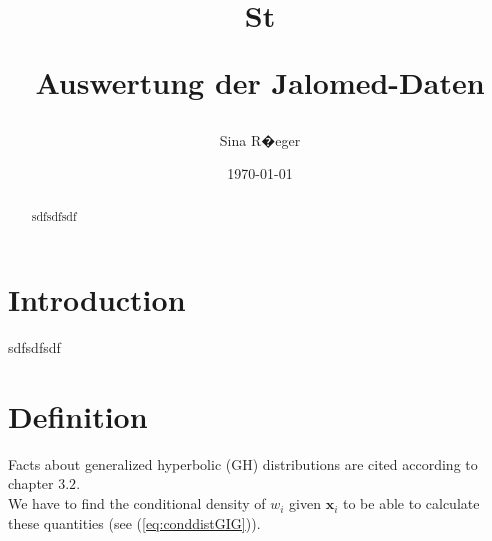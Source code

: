 \documentclass[paper=a4,fontsize=11pt,parskip=half,titlepage,headsepline,tocleft,english]{scrreprt}
\newcommand{\x}{\mathbf{x}}
\newcommand{\EXP}[1]{\hbox{E}(#1)}
\newcommand{\etaIK}{\eta_i^{[k]}}
\newcommand{\deltaIK}{\delta_i^{[k]}}
\newcommand{\xiIK}{\xi_i^{[k]}}
\newcommand{\ThetaK}{\Theta^{[k]}}
\renewcommand{\labelenumi}{(\roman{enumi})}
\numberwithin{equation}{section}
\numberwithin{table}{section}
\numberwithin{figure}{section}
\begin{document}
\title{St





















 Auswertung der Jalomed-Daten}
\author{Sina R�eger}
\date{\today}

\maketitle

\begin{abstract}
sdfsdfsdf
\end{abstract}
\thispagestyle{empty}
\clearpage
{}
\tableofcontents{}
\clearpage
\section{Introduction}
sdfsdfsdf
\section{Definition}
Facts about generalized hyperbolic (GH) distributions are cited according to
\cite{mcneil} chapter $3.2$.\\[1ex]


We have to find the conditional density of $w_i$ given $\x_i$ to
be able to calculate these quantities (see (\ref{eq:conddistGIG})).
 
\end{document}
